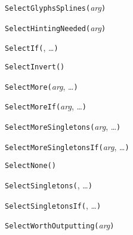 \texttt{SelectGlyphsSplines(}\textit{arg}\texttt{)}



\texttt{SelectHintingNeeded(}\textit{arg}\texttt{)}



\texttt{SelectIf(}, \ldots\texttt{)}



\texttt{SelectInvert(}\texttt{)}



\texttt{SelectMore(}\textit{arg}, \ldots\texttt{)}



\texttt{SelectMoreIf(}\textit{arg}, \ldots\texttt{)}



\texttt{SelectMoreSingletons(}\textit{arg}, \ldots\texttt{)}



\texttt{SelectMoreSingletonsIf(}\textit{arg}, \ldots\texttt{)}



\texttt{SelectNone(}\texttt{)}



\texttt{SelectSingletons(}, \ldots\texttt{)}



\texttt{SelectSingletonsIf(}, \ldots\texttt{)}



\texttt{SelectWorthOutputting(}\textit{arg}\texttt{)}

